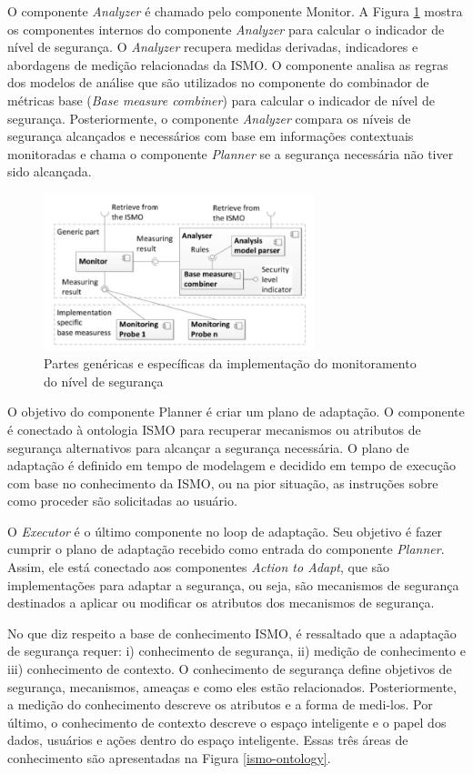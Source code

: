 \documentclass[tid,table]{texufpel} %
\begin{document}
O componente \textit{Analyzer} é chamado pelo componente Monitor. A Figura \ref{ismo-monitor} mostra os componentes internos do componente  \textit{Analyzer} para calcular o indicador de nível de segurança. O \textit{Analyzer} recupera medidas derivadas, indicadores e abordagens de medição relacionadas da ISMO. O componente analisa as regras dos modelos de análise que são utilizados no componente do combinador de métricas base (\textit{Base measure combiner}) para calcular o indicador de nível de segurança. Posteriormente, o componente \textit{Analyzer} compara os níveis de segurança alcançados e necessários com base em informações contextuais monitoradas e chama o componente \textit{Planner} se a segurança necessária não tiver sido alcançada. 


\begin{figure}[ht]
\centering
\includegraphics[width=0.7\textwidth]{imagens/ismo-monitor.png}
\caption{Partes genéricas e específicas da implementação do monitoramento do nível de segurança}
\label{ismo-monitor}
\end{figure}

O objetivo do componente Planner é criar um plano de adaptação. O componente é conectado à ontologia ISMO para recuperar mecanismos ou atributos de segurança alternativos para alcançar a segurança necessária. O plano de adaptação é definido em tempo de modelagem e decidido em tempo de execução com base no conhecimento da ISMO, ou na pior situação, as instruções sobre como proceder são solicitadas ao usuário.

O \textit{Executor} é o último componente no loop de adaptação. Seu objetivo é fazer cumprir o plano de adaptação recebido como entrada do componente \textit{Planner}. Assim, ele está conectado aos componentes \textit{Action to Adapt}, que são implementações para adaptar a segurança, ou seja, são mecanismos de segurança destinados a aplicar ou modificar os atributos dos mecanismos de segurança.

No que diz respeito a base de conhecimento ISMO, é ressaltado que a adaptação de segurança requer: i) conhecimento de segurança, ii) medição de conhecimento e iii) conhecimento de contexto. O conhecimento de segurança define objetivos de segurança, mecanismos, ameaças e como eles estão relacionados. Posteriormente, a medição do conhecimento descreve os atributos e a forma de medi-los. Por último, o conhecimento de contexto descreve o espaço inteligente e o papel dos dados, usuários e ações dentro do espaço inteligente. Essas três áreas de conhecimento são apresentadas na Figura \ref{ismo-ontology}.
\end{document}
